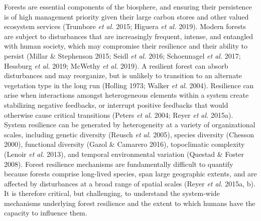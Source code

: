 \documentclass[]{article}
\begin{document}
Forests are essential components of the biosphere, and ensuring their
persistence is of high management priority given their large carbon
stores and other valued ecosystem services (Trumbore \emph{et al.} 2015;
Higuera \emph{et al.} 2019). Modern forests are subject to disturbances
that are increasingly frequent, intense, and entangled with human
society, which may compromise their resilience and their ability to
persist (Millar \& Stephenson 2015; Seidl \emph{et al.} 2016;
Schoennagel \emph{et al.} 2017; Hessburg \emph{et al.} 2019; McWethy
\emph{et al.} 2019). A resilient forest can absorb disturbances and may
reorganize, but is unlikely to transition to an alternate vegetation
type in the long run (Holling 1973; Walker \emph{et al.} 2004).
Resilience can arise when interactions amongst heterogeneous elements
within a system create stabilizing negative feedbacks, or interrupt
positive feedbacks that would otherwise cause critical transitions
(Peters \emph{et al.} 2004; Reyer \emph{et al.} 2015a). System
resilience can be generated by heterogeneity at a variety of
organizational scales, including genetic diversity (Reusch \emph{et al.}
2005), species diversity (Chesson 2000), functional diversity (Gazol \&
Camarero 2016), topoclimatic complexity (Lenoir \emph{et al.} 2013), and
temporal environmental variation (Questad \& Foster 2008). Forest
resilience mechanisms are fundamentally difficult to quantify because
forests comprise long-lived species, span large geographic extents, and
are affected by disturbances at a broad range of spatial scales (Reyer
\emph{et al.} 2015a, b). It is therefore critical, but challenging, to
understand the system-wide mechanisms underlying forest resilience and
the extent to which humans have the capacity to influence them.
\end{document}
